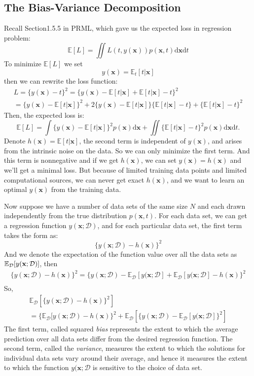 \documentclass[a4paper]{book}
\newcommand{\mrm}{\mathrm}
\newcommand{\mbf}{\mathbf}
\newcommand{\mcal}{\mathcal}
\newcommand{\xx}{\mbf x}
\newcommand{\Exp}{\mathbb{E}}
\newcommand{\calD}{\mcal D}
\begin{document}
\subsection{The Bias-Variance Decomposition}
Recall Section1.5.5 in PRML, which gave us the expected loss in regression problem:
\begin{equation}\label{}
\mathbb{E}[L]=\iint L(t,y(\xx))p(\xx,t)\mrm d\xx\mrm dt
\end{equation}
To minimize $\mathbb E[L]$ we set
\begin{equation}\label{}
  y(\xx) = \mathbb E_t[t|\xx]
\end{equation}
then we can rewrite the loss function:
\begin{gather}\label{}
L =  \{y(\xx)-t\}^2 = \{y(\xx) - \mathbb E[t|\xx] + \mathbb E[t|\xx] -t\}^2 \\
  =\{y(\xx)-\Exp[t|\xx]\}^2+2\{y(\xx)-\Exp[t|\xx]\}\{\Exp[t|\xx]-t\}+\{\Exp[t|\xx]-t\}^2
\end{gather}
Then, the expected loss is:
\begin{equation}\label{}
\Exp[L] = \int\{y(\xx)-\Exp[t|\xx]\}^2p(\xx)\mrm d\xx+\iint \{\Exp[t|\xx]-t\}^2p(\xx)\mrm d\xx\mrm dt.
\end{equation}
Denote $h(\xx) = \Exp[t|\xx]$, the second term is independent of $y(\xx)$, and arises from the intrinsic noise on the data. So we can only minimize the first term. And this term is nonnegative and if we get $h(\xx)$, we can set $y(\xx) = h(\xx)$ and we'll get a minimal loss. But because of limited training data points and limited computational sources, we can never get exact $h(\xx)$, and we want to learn an optimal $y(\xx)$ from the training data.

Now suppose we have a number of data sets of the same size $N$ and each drawn independently from the true distribution $p(\xx,t)$. For each data set, we can get a regression function $y(\xx;\mathcal D)$, and for each particular data set, the first term takes the form as:
\begin{equation}\label{}
  \{y(\xx;\calD)-h(\xx)\}^2
\end{equation}
And we denote the expectation of the function value over all the data sets as $ \Exp_{\calD}[y(\xx;\cal D)]$, then
\begin{gather}\label{}
  \{y(\xx;\calD)-h(\xx)\}^2 = \{y(\xx;\calD)-\Exp_{\calD}[y(\xx;\calD]+\Exp_{\calD}[y(\xx;\calD]-h(\xx)\}^2 \\
\end{gather}
So,
\begin{gather}\label{}
  \Exp_\calD[\{y(\xx;\calD)-h(\xx)\}^2] \\
  = \{\Exp_\calD[y(\xx;\calD)-h(\xx)\}^2 +\Exp_\calD[\{y(\xx;\calD)-\Exp_\calD[y(\xx;\calD]\}^2]
\end{gather}
The first term, called squared \textit{bias} represents the extent to which the average prediction over all data sets differ from the desired regression function. The second term, called the \textit{variance}, measures the extent to which the solutions for individual data sets vary around their average, and hence it measures the extent to which the function $y(\xx;\calD$ is sensitive to the choice of data set.
\end{document}
